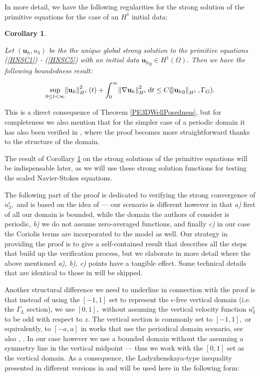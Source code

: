 \documentclass[11pt]{article}
\newtheorem{corollary}{Corollary}
\newcommand*\diff{\mathop{}\!\mathrm{d}}
\begin{document}
  In more detail, we have the following regularities for the strong solution of the primitive equations for the case of an $H^1$ initial data:
  
  \begin{corollary} \label{StrongSolPE_boundedness}
  
    Let $(\mathbf{u}_h,u_3)$ be the the unique global strong solution to the primitive equations (\ref{HNSC1}) - (\ref{HNSC5}) with an initial data ${\mathbf{u}_h}_0 \in H^1(\Omega).$ Then we have the following boundedness result:
    
    $$ \sup_{0 \leq t < \infty} \norm{\mathbf{u}_h}_{H^1}^2 (t) + \int_0^\infty \norm{\nabla \mathbf{u}_h}_{H^1}^2 \diff t \leq C(\norm{{\mathbf{u}_h}_0}_{H^1}, \Gamma_G).$$
  
  \end{corollary}
  
  This is a direct consequence of Theorem \ref{PE3DWellPosedness}, but for completeness we also mention that for the simpler case of a periodic domain it has also been verified in \cite{li2019primitive}, where the proof becomes more straightforward thanks to the structure of the domain.
  
  The result of Corollary \ref{StrongSolPE_boundedness} on the strong solutions of the primitive equations will be indispensable later, as we will use these strong solution functions for testing the scaled Navier-Stokes equations.
  
  The following part of the proof is dedicated to verifying the strong convergence of $u_3^\epsilon,$ and is based on the idea of \cite{li2019primitive} --- our scenario is different however in that \textit{a)} first of all our domain is bounded, while the domain the authors of \cite{li2019primitive} consider is periodic, \textit{b)} we do not assume zero-averaged functions, and finally \textit{c)} in our case the Coriolis terms are incorporated to the model as well. Our strategy in providing the proof is to give a self-contained result that describes all the steps that build up the verification process, but we elaborate in more detail where the above mentioned \textit{a), b), c)} points have a tangible effect. Some technical details that are identical to those in \cite{li2019primitive} will be skipped.

Another structural difference we need to underline in connection with the proof is that instead of using the $[-1,1]$ set to represent the $\epsilon$-free vertical domain (i.e. the $\Gamma_L$ section), we use $[0,1],$ without assuming the vertical velocity function $u_3^\epsilon$ to be odd with respect to $z.$ The vertical section is commonly set to $[-1,1],$ or equivalently, to $[-a,a]$ in works that use the periodical domain scenario, see also \cite{cao2016global}, \cite{cao2017global}. In our case however we use a bounded domain without the assuming a symmetry line in the vertical midpoint --- thus we work with the $[0,1]$ set as the vertical domain. As a consequence, the Ladyzhenskaya-type inequality presented in different versions in \cite{cao2003global} and \cite{li2019primitive} will be used here in the following form:
\end{document}

